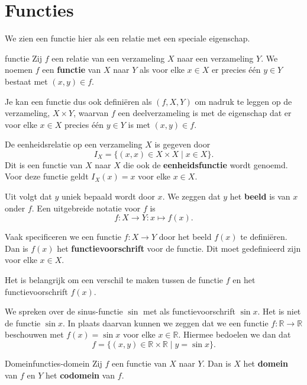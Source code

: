 \chapter{Functies}
We zien een functie hier als een relatie met een speciale eigenschap.
\begin{definitie}{}{functie}
    Zij $f$ een relatie van een verzameling $X$ naar een verzameling $Y$.
    We noemen $f$ een \textbf{functie} van $X$ naar $Y$ als voor elke $x \in X$ er precies één $y \in Y$ bestaat met $(x,y) \in f$.
\end{definitie}
\begin{opmerking}{}
    Je kan een functie dus ook definiëren als $(f,X,Y)$ om nadruk te leggen op de verzameling, $X \times Y$, waarvan $f$ een deelverzameling is met de eigenschap dat er voor elke $x \in X$ precies één $y \in Y$ is met $(x,y) \in f$.
\end{opmerking}
\begin{voorbeeld}{}{}
    De eenheidsrelatie op een verzameling $X$ is gegeven door
    \[
        I_X = \{(x,x) \in X \times X \mid x \in X\}.
    \]
    Dit is een functie van $X$ naar $X$ die ook de \textbf{eenheidsfunctie} wordt genoemd.
    Voor deze functie geldt $I_X(x) = x$ voor elke $x \in X$.
\end{voorbeeld}

Uit  volgt dat $y$ uniek bepaald wordt door $x$.
We zeggen dat $y$ het \textbf{beeld} is van $x$ onder $f$.
Een uitgebreide notatie voor $f$ is
\[
    f: X \to Y: x \mapsto f(x).
\]

Vaak specificeren we een functie $f: X \to Y$ door het beeld $f(x)$ te definiëren.
Dan is $f(x)$ het \textbf{functievoorschrift} voor de functie.
Dit moet gedefinieerd zijn voor elke $x \in X$.

Het is belangrijk om een verschil te maken tussen de functie $f$ en het functievoorschrift $f(x)$.
\begin{voorbeeld}{}{}
    We spreken over de sinus-functie $\sin$ met als functievoorschrift $\sin x$.
    Het is niet de functie $\sin x$.
    In plaats daarvan kunnen we zeggen dat we een functie $f: \mathbb{R} \to \mathbb{R}$ beschouwen met $f(x) = \sin x$ voor elke $x \in \mathbb{R}$.
    Hiermee bedoelen we dan dat
    \[
        f = \{(x,y) \in \mathbb{R} \times \mathbb{R} \mid y = \sin x\}.
    \]
\end{voorbeeld}
\begin{definitie}{Domein}{functies-domein}
    Zij $f$ een functie van $X$ naar $Y$.
    Dan is $X$ het \textbf{domein} van $f$ en $Y$ het \textbf{codomein} van $f$.
\end{definitie}

